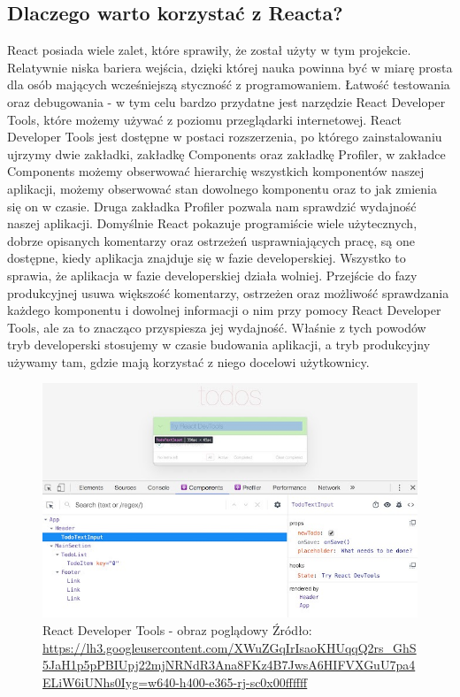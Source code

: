 \documentclass[oneside,polski,logo,indent]{amuthesis}
\begin{document}
\begin{enumerate}
\begin{enumerate}
{}

\section{Dlaczego warto korzystać z Reacta?}{
React posiada wiele zalet, które sprawiły, że został użyty w tym projekcie. Relatywnie niska bariera wejścia, dzięki której nauka powinna być w miarę prosta dla osób mających wcześniejszą styczność z programowaniem. Łatwość testowania oraz debugowania - w tym celu bardzo przydatne jest narzędzie React Developer Tools, które możemy używać z poziomu przeglądarki internetowej. React Developer Tools jest dostępne w postaci rozszerzenia, po którego zainstalowaniu ujrzymy dwie zakładki, zakładkę Components oraz zakładkę Profiler, w zakładce Components możemy obserwować hierarchię wszystkich komponentów naszej aplikacji, możemy obserwować stan dowolnego komponentu oraz to jak zmienia się on w czasie. Druga zakładka Profiler pozwala nam sprawdzić wydajność naszej aplikacji. Domyślnie React pokazuje programiście wiele użytecznych, dobrze opisanych komentarzy oraz ostrzeżeń usprawniających pracę, są one dostępne, kiedy aplikacja znajduje się w fazie developerskiej. Wszystko to sprawia, że aplikacja w fazie developerskiej działa wolniej. Przejście do fazy produkcyjnej usuwa większość komentarzy, ostrzeżen oraz możliwość sprawdzania każdego komponentu i dowolnej informacji o nim przy pomocy React Developer Tools, ale za to znacząco przyspiesza jej wydajność.
Właśnie z tych powodów tryb developerski stosujemy w czasie budowania aplikacji, a tryb produkcyjny używamy tam, gdzie mają korzystać z niego docelowi użytkownicy.



\begin{figure}[H]
\centering
\includegraphics[width=13cm]{react dev example.jpg}
\caption{React Developer Tools - obraz poglądowy
\newline
Źródło: \url{https://lh3.googleusercontent.com/XWuZGqIrIsaoKHUqqQ2rs_GhS5JaH1p5pPBIUpj22mjNRNdR3Ana8FKz4B7JwsA6HIFVXGuU7pa4ELiW6iUNhs0Iyg=w640-h400-e365-rj-sc0x00ffffff}
}
\label{react dev example.jpg}
\end{figure}

}
\end{enumerate}
\end{enumerate}
\end{document}
